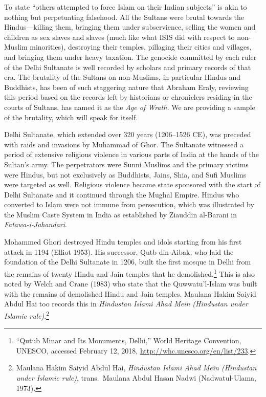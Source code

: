 To state “others attempted to force Islam on their Indian subjects” is akin to nothing but perpetuating falsehood. All the Sultans were brutal towards the Hindus—killing them, bringing them under subservience, selling the women and children as sex slaves and slaves (much like what ISIS did with respect to non-Muslim minorities), destroying their temples, pillaging their cities and villages, and bringing them under heavy taxation. The genocide committed by each ruler of the Delhi Sultanate is well recorded by scholars and primary records of that era. The brutality of the Sultans on non-Muslims, in particular Hindus and Buddhists, has been of such staggering nature that Abraham Eraly, reviewing this period based on the records left by historians or chroniclers residing in the courts of Sultans, has named it as the \textit{Age of Wrath.} We are providing a sample of the brutality, which will speak for itself. 

Delhi Sultanate, which extended over 320 years (1206--1526 CE), was preceded with raids and invasions by Muhammad of Ghor. The Sultanate witnessed a period of extensive religious violence in various parts of India at the hands of the Sultan’s army. The perpetrators were Sunni Muslims and the primary victims were Hindus, but not exclusively as Buddhists, Jains, Shia, and Sufi Muslims were targeted as well. Religious violence became state sponsored with the start of Delhi Sultanate and it continued through the Mughal Empire. Hindus who converted to Islam were not immune from persecution, which was illustrated by the Muslim Caste System in India as established by Ziauddin al-Barani in\textit{ Fatawa-i-Jahandari}.

Mohammed Ghori destroyed Hindu temples and idols starting from his first attack in 1194 (Elliot 1953). His successor, Qutb-din-Aibak, who laid the foundation of the Delhi Sultanate in 1206, built the first mosque in Delhi from the remains of twenty Hindu and Jain temples that he demolished.\footnote{“Qutub Minar and Its Monuments, Delhi,” World Heritage 	Convention, UNESCO, accessed February 12, 2018, \url{http://whc.unesco.org/en/list/233}.} This is also noted by Welch and Crane (1983) who state that the Quwwatu'l-Islam was built with the remains of demolished Hindu and Jain temples. Maulana Hakim Saiyid Abdul Hai too records this in \textit{Hindustan Islami Ahad Mein (Hindustan under Islamic rule)}.\footnote{Maulana 	Hakim Saiyid Abdul Hai, \textit{Hindustan Islami Ahad Mein (Hindustan under Islamic rule)}, trans.\ Maulana Abdul Hasan Nadwi (Nadwatul-Ulama, 1973).} 

